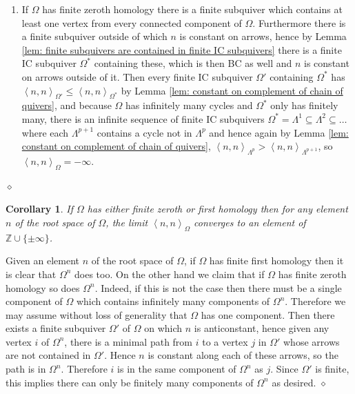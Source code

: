 \documentclass{article}
\newcommand{\bracket}[1]{\left \langle #1 \right\rangle}
\newtheorem{corollary}{Corollary}[section]
\newenvironment{proof}{\vspace*{2ex}\noindent {\em Proof:}
}{\hfill $\diamond$ \\[2ex]}
\begin{document}
\begin{proof}
\begin{enumerate}
\item If $\Omega$ has finite zeroth homology there is a finite subquiver which contains at least one vertex from every connected component of $\Omega$. Furthermore there is a finite subquiver outside of which $n$ is constant on arrows, hence by Lemma \ref{lem: finite subquivers are contained in finite IC subquivers} there is a finite IC subquiver $\Omega^*$ containing these, which is then BC as well and $n$ is constant on arrows outside of it. Then every finite IC subquiver $\Omega'$ containing $\Omega^*$ has $\bracket{n , n}_{\Omega'} \leq \bracket{n , n}_{\Omega^*}$ by Lemma \ref{lem: constant on complement of chain of quivers}, and because $\Omega$ has infinitely many cycles and $\Omega^*$ only has finitely many, there is an infinite sequence of finite IC subquivers $\Omega^* = \Lambda^1 \subseteq \Lambda^2 \subseteq \ldots$ where each $\Lambda^{p + 1}$ contains a cycle not in $\Lambda^p$ and hence again by Lemma \ref{lem: constant on complement of chain of quivers}, $\bracket{n , n}_{\Lambda^p} > \bracket{n , n}_{\Lambda^{p + 1}}$, so $\bracket{n , n}_{\Omega} = -\infty$. 
\end{enumerate}
\end{proof}

\begin{corollary}
    If $\Omega$ has either finite zeroth or first homology then for any element $n$ of the root space of $\Omega$, the limit $\bracket{n , n}_\Omega$ converges to an element of $\mathbb{Z} \cup \{ \pm \infty \}$. 
\end{corollary}

\begin{proof}
    Given an element $n$ of the root space of $\Omega$, if $\Omega$ has finite first homology then it is clear that $\Omega^n$ does too. On the other hand we claim that if $\Omega$ has finite zeroth homology so does $\Omega^n$. Indeed, if this is not the case then there must be a single component of $\Omega$ which contains infinitely many components of $\Omega^n$. Therefore we may assume without loss of generality that $\Omega$ has one component. Then there exists a finite subquiver $\Omega'$ of $\Omega$ on which $n$ is anticonstant, hence given any vertex $i$ of $\Omega^n$, there is a minimal path from $i$ to a vertex $j$ in $\Omega'$ whose arrows are not contained in $\Omega'$. Hence $n$ is constant along each of these arrows, so the path is in $\Omega^n$. Therefore $i$ is in the same component of $\Omega^n$ as $j$. Since $\Omega'$ is finite, this implies there can only be finitely many components of $\Omega^n$ as desired. 
\end{proof}
\end{document}
